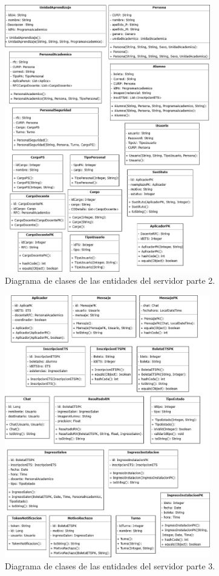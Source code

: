 \begin{figure}[htbp!]
	\begin{center}
		\includegraphics[width=0.8\textwidth]{Clases/EntidadesP2.png}
		\caption{Diagrama de clases de las entidades del servidor parte 2.}
		\label{fig:DE2}
	\end{center}
\end{figure}


\begin{figure}[htbp!]
	\begin{center}
		\includegraphics[width=0.8\textwidth]{Clases/EntidadesP3.png}
		\caption{Diagrama de clases de las entidades del servidor parte 3.}
		\label{fig:DE3}
	\end{center}
\end{figure}

\newpage